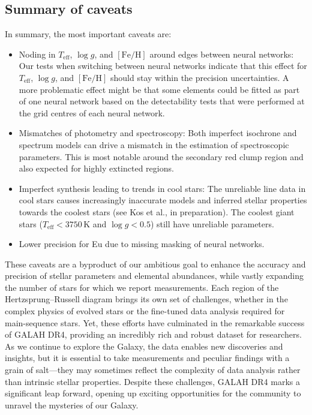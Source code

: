\documentclass[
  journal=pasa,
  manuscript=research-paper, %
  year=2024,
  volume=37
]{cup-journal}
\newcommand{\Teff}{$T_\mathrm{eff}$\xspace}
\newcommand{\logg}{$\log g$\xspace}
\newcommand{\feh}{$\mathrm{[Fe/H]}$\xspace}
\newcommand{\TLF}{\Teff, \logg, and \feh}
\begin{document}
\subsection{Summary of caveats} \label{sec:caveats_summary}

In summary, the most important caveats are:
\begin{itemize}
    \item Noding in \TLF around edges between neural networks: Our tests when switching between neural networks indicate that this effect for \TLF should stay within the precision uncertainties. A more problematic effect might be that some elements could be fitted as part of one neural network based on the detectability tests that were performed at the grid centres of each neural network.
    \item Mismatches of photometry and spectroscopy: Both imperfect isochrone and spectrum models can drive a mismatch in the estimation of spectroscopic parameters. This is most notable around the secondary red clump region and also expected for highly extincted regions.
    \item Imperfect synthesis leading to trends in cool stars: The unreliable line data in cool stars causes increasingly inaccurate models and inferred stellar properties towards the coolest stars (see Kos et al., in preparation). The coolest giant stars ($T_\mathrm{eff} < 3750\,\mathrm{K}$ and $\log g < 0.5$) still have unreliable parameters.
    \item Lower precision for Eu due to missing masking of neural networks.
\end{itemize}

These caveats are a byproduct of our ambitious goal to enhance the accuracy and precision of stellar parameters and elemental abundances, while vastly expanding the number of stars for which we report measurements. Each region of the Hertzsprung–Russell diagram brings its own set of challenges, whether in the complex physics of evolved stars or the fine-tuned data analysis required for main-sequence stars. Yet, these efforts have culminated in the remarkable success of GALAH DR4, providing an incredibly rich and robust dataset for researchers. As we continue to explore the Galaxy, the data enables new discoveries and insights, but it is essential to take measurements and peculiar findings with a grain of salt—they may sometimes reflect the complexity of data analysis rather than intrinsic stellar properties. Despite these challenges, GALAH DR4 marks a significant leap forward, opening up exciting opportunities for the community to unravel the mysteries of our Galaxy.
\end{document}
